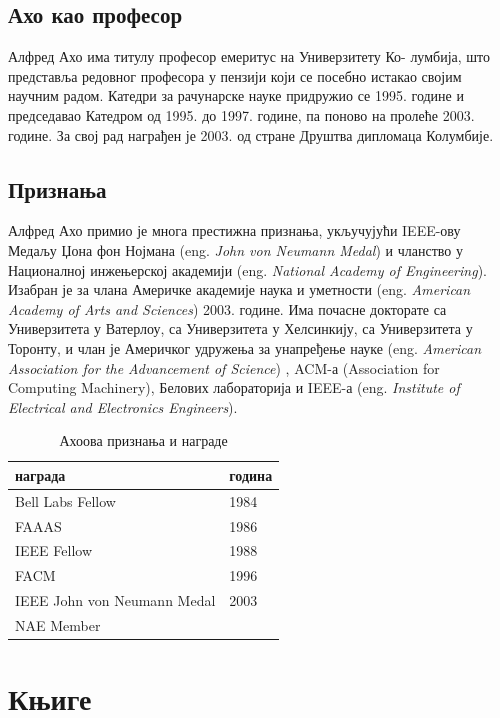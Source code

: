 \documentclass[a4paper]{article}
\begin{document}
\subsection{Ахо као професор}
\label{subsec:podnaslov6}
Алфред Ахо има титулу професор емеритус на Универзитету Ко-
лумбија, што представља редовног професора у пензији који се посебно истакао својим научним радом. Катедри за рачунарске науке придружио се 1995. године и председавао Катедром од 1995. до 1997. године, па поново на пролеће 2003. године. За свој рад награђен је 2003. од стране Друштва дипломаца Колумбије.

\subsection{Признања}
\label{subsec:podnaslov7}
Алфред Ахо примио је многа престижна признања, укључујући IEEE-ову Медаљу Џона фон Нојмана (eng. \emph {John von Neumann Medal}) и чланство у Националној инжењерској академији (eng. \emph {National Academy of Engineering}). Изабран је за члана Америчке академије наука и уметности (eng. \emph {American Academy of Arts and Sciences}) 2003. године. Има почасне докторате са Универзитета у Ватерлоу, са Универзитета у Хелсинкију, са Универзитета у Торонту, и члан је Америчког удружења за унапређење науке (eng. \emph{American Association for the Advancement of Science}) , ACM-а (Association for Computing Machinery), Белових лабораторија и IEEE-а (eng. \emph {Institute of Electrical and Electronics Engineers}).


\begin{table}[h!]
\begin{center}
\caption{Ахоова признања и награде}
\begin{tabular}{|l|l|} \hline
награда& година\\ \hline
Bell Labs Fellow &1984\\ \hline
FAAAS &1986\\ \hline
IEEE Fellow &1988\\ \hline
FACM &1996\\ \hline
IEEE John von Neumann Medal &2003\\ \hline
NAE Member &\\ \hline

\end{tabular}
\label{tab:tabela2}
\end{center}
\end{table}

\section{Књиге}
\end{document}
